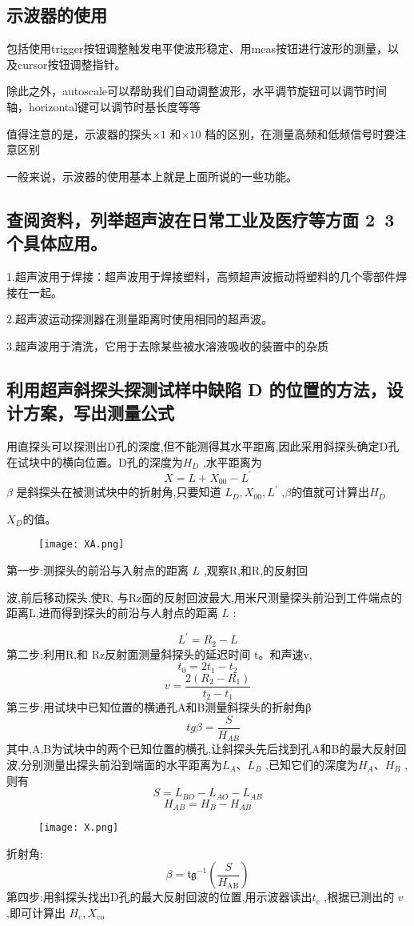 \documentclass[12pt, a4paper, oneside]{ctexbook}
\begin{document}
\subsection*{示波器的使用}
包括使用trigger按钮调整触发电平使波形稳定、用meas按钮进行波形的测量，以及cursor按钮调整指针。

除此之外，autoscale可以帮助我们自动调整波形，水平调节旋钮可以调节时间轴，horizontal键可以调节时基长度等等

值得注意的是，示波器的探头$ \times 1 $ 和$ \times 10 $ 档的区别，在测量高频和低频信号时要注意区别

一般来说，示波器的使用基本上就是上面所说的一些功能。
\subsection*{查阅资料，列举超声波在日常工业及医疗等方面 2~3 个具体应用。}
1.超声波用于焊接：超声波用于焊接塑料，高频超声波振动将塑料的几个零部件焊接在一起。

2.超声波运动探测器在测量距离时使用相同的超声波。

3.超声波用于清洗，它用于去除某些被水溶液吸收的装置中的杂质

\subsection*{ 利用超声斜探头探测试样中缺陷 D 的位置的方法，设计方案，写出测量公式}
用直探头可以探测出D孔的深度,但不能测得其水平距离,因此采用斜探头确定D孔在试块中的横向位置。D孔的深度为$ H_D $ ,水平距离为
$$
    X=L+X_{\mathrm{00}}-L^{'}
$$
$ \beta $ 是斜探头在被测试块中的折射角,只要知道 $L_{D},X_{00},L^{'}$ ,$ \beta $的值就可计算出$ H_D $

$X_D$的值。
\begin{figure}[!h]
    \begin{center}
        \texttt{[image: XA.png]}
    \end{center}
\end{figure}

第一步:测探头的前沿与入射点的距离 $L$ ,观察R,和R,的反射回

波,前后移动探头,使R, 与Rz面的反射回波最大,用米尺测量探头前沿到工件端点的距离L,进而得到探头的前沿与人射点的距离 $L$ :

$$
    L^{'}=R_{2}-L
$$
第二步:利用R,和 Rz反射面测量斜探头的延迟时间 t。和声速v,
$$
    t_0=2t_1-t_2
$$
$$
    v=\frac{2(R_{2}-R_{1})}{t_{2}-t_{1}}
$$
第三步:用试块中已知位置的横通孔A和B测量斜探头的折射角β
$$
    \quad tg\beta=\frac{S}{H_{AB}}
$$
其中,A,B为试块中的两个已知位置的横孔,让斜探头先后找到孔A和B的最大反射回波,分别测量出探头前沿到端面的水平距离为$ L_A、L_B $ ,已知它们的深度为$ H_A、H_B $ ,则有
$$
    S=L_{B O}-L_{A O}-L_{A B}
$$
$$
    H_{A B}=H_{B}-H_{A B}
$$
\begin{figure}[!h]
    \begin{center}
        \texttt{[image: X.png]}
    \end{center}
\end{figure}
折射角:
$$
    \beta=\mathfrak{t g}^{-1}\left(\frac{S}{H_{\mathrm{AB}}}\right)
$$
第四步:用斜探头找出D孔的最大反射回波的位置,用示波器读出$ t_c $ ,根据已测出的
$ v $ ,即可计算出 $H_{\mathrm{c}},X_{\mathrm{co}}$
\newpage
\end{document}
